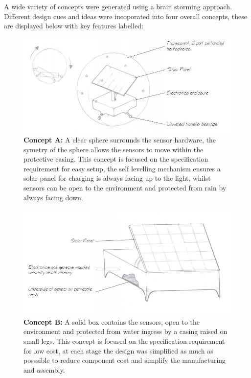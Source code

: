 A wide variety of concepts were generated using a brain storming approach. Different design cues and ideas were incoporated into four overall concepts, these are displayed below with key features labelled:


\begin{figure}[H]
\centering
\includegraphics[width=0.6\linewidth]{Engineering_hardware/Engineering_hardware_Figures/Concept_ball.JPG}
\caption{\textbf{Concept A:} A clear sphere surrounds the sensor hardware, the symetry of the sphere allows the sensors to move within the protective casing. This concept is focused on the specification requirement for easy setup, the self levelling mechanism ensures a solar panel for charging is always facing up to the light, whilst sensors can be open to the environment and protected from rain by always facing down. }
\label{fig:concept_A}
\end{figure}

\begin{figure}[H]
\centering
\includegraphics[width=0.6\linewidth]{Engineering_hardware/Engineering_hardware_Figures/Concept_box.JPG}
\caption{\textbf{Concept B:} A solid box contains the sensors, open to the environment and protected from water ingress by a casing raised on small legs. This concept is focused on the specification requirement for low cost, at each stage the design was simplified as much as posssible to reduce component cost and simplify the manufacturing and assembly.}
\label{fig:concept_B}
\end{figure}


